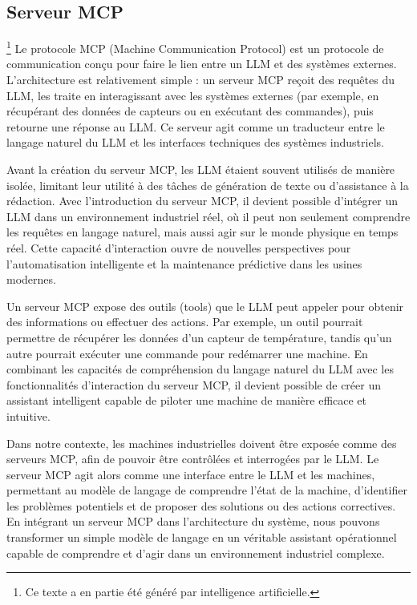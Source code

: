 \subsection{Serveur MCP}\footnote{Ce texte a en partie été généré par intelligence artificielle.}
Le protocole MCP (Machine Communication Protocol) est un protocole de communication conçu pour faire le lien entre un LLM et des systèmes externes. L'architecture est relativement simple : un serveur MCP reçoit des requêtes du LLM, les traite en interagissant avec les systèmes externes (par exemple, en récupérant des données de capteurs ou en exécutant des commandes), puis retourne une réponse au LLM. Ce serveur agit comme un traducteur entre le langage naturel du LLM et les interfaces techniques des systèmes industriels.

Avant la création du serveur MCP, les LLM étaient souvent utilisés de manière isolée, limitant leur utilité à des tâches de génération de texte ou d'assistance à la rédaction. Avec l'introduction du serveur MCP, il devient possible d'intégrer un LLM dans un environnement industriel réel, où il peut non seulement comprendre les requêtes en langage naturel, mais aussi agir sur le monde physique en temps réel. Cette capacité d'interaction ouvre de nouvelles perspectives pour l'automatisation intelligente et la maintenance prédictive dans les usines modernes.

Un serveur MCP expose des outils (tools) que le LLM peut appeler pour obtenir des informations ou effectuer des actions. Par exemple, un outil pourrait permettre de récupérer les données d'un capteur de température, tandis qu'un autre pourrait exécuter une commande pour redémarrer une machine. En combinant les capacités de compréhension du langage naturel du LLM avec les fonctionnalités d'interaction du serveur MCP, il devient possible de créer un assistant intelligent capable de piloter une machine de manière efficace et intuitive.

Dans notre contexte, les machines industrielles doivent être exposée comme des serveurs MCP, afin de pouvoir être contrôlées et interrogées par le LLM. Le serveur MCP agit alors comme une interface entre le LLM et les machines, permettant au modèle de langage de comprendre l'état de la machine, d'identifier les problèmes potentiels et de proposer des solutions ou des actions correctives. En intégrant un serveur MCP dans l'architecture du système, nous pouvons transformer un simple modèle de langage en un véritable assistant opérationnel capable de comprendre et d'agir dans un environnement industriel complexe.

